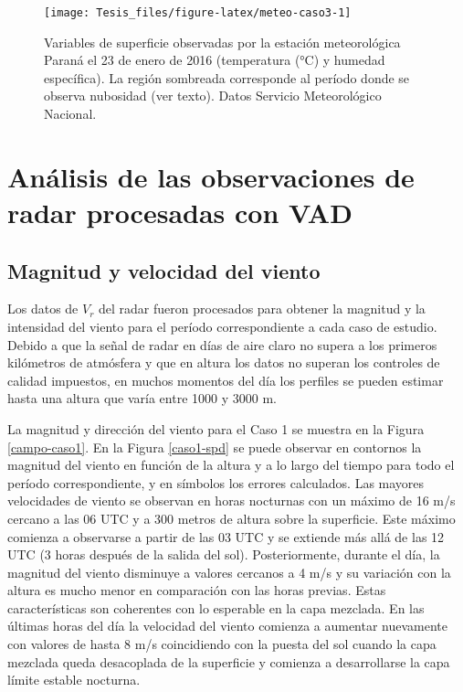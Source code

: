 \documentclass[12pt,spanish,oneside, a4paper]{book}
\begin{document}
\begin{figure}

{\centering \texttt{[image: Tesis\_files/figure-latex/meteo-caso3-1]} 

}

\caption{Variables de superficie observadas por la estación meteorológica Paraná el 23 de enero de 2016 (temperatura (°C) y humedad específica). La región sombreada corresponde al período donde se observa nubosidad (ver texto). Datos Servicio Meteorológico Nacional. \label{meteo3}}\label{fig:meteo-caso3}
\end{figure}

\section{Análisis de las observaciones de radar procesadas con
VAD}\label{analisis-de-las-observaciones-de-radar-procesadas-con-vad}

\subsection{Magnitud y velocidad del
viento}\label{magnitud-y-velocidad-del-viento}

Los datos de \(V_r\) del radar fueron procesados para obtener la
magnitud y la intensidad del viento para el período correspondiente a
cada caso de estudio. Debido a que la señal de radar en días de aire
claro no supera a los primeros kilómetros de atmósfera y que en altura
los datos no superan los controles de calidad impuestos, en muchos
momentos del día los perfiles se pueden estimar hasta una altura que
varía entre 1000 y 3000 m.

La magnitud y dirección del viento para el Caso 1 se muestra en la
Figura \ref{campo-caso1}. En la Figura \ref{caso1-spd} se puede observar
en contornos la magnitud del viento en función de la altura y a lo largo
del tiempo para todo el período correspondiente, y en símbolos los
errores calculados. Las mayores velocidades de viento se observan en
horas nocturnas con un máximo de 16 m/s cercano a las 06 UTC y a 300
metros de altura sobre la superficie. Este máximo comienza a observarse
a partir de las 03 UTC y se extiende más allá de las 12 UTC (3 horas
después de la salida del sol). Posteriormente, durante el día, la
magnitud del viento disminuye a valores cercanos a 4 m/s y su variación
con la altura es mucho menor en comparación con las horas previas. Estas
características son coherentes con lo esperable en la capa mezclada. En
las últimas horas del día la velocidad del viento comienza a aumentar
nuevamente con valores de hasta 8 m/s coincidiendo con la puesta del sol
cuando la capa mezclada queda desacoplada de la superficie y comienza a
desarrollarse la capa límite estable nocturna.
\end{document}
